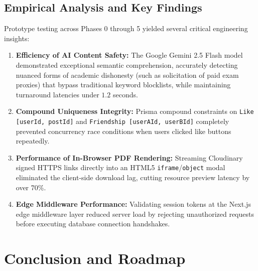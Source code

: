 \documentclass[12pt, a4paper, oneside]{report}
\begin{document}
\section{Empirical Analysis and Key Findings}
Prototype testing across Phases 0 through 5 yielded several critical engineering insights:
\begin{enumerate}[leftmargin=0.7cm]
    \item \textbf{Efficiency of AI Content Safety:} The Google Gemini 2.5 Flash model demonstrated exceptional semantic comprehension, accurately detecting nuanced forms of academic dishonesty (such as solicitation of paid exam proxies) that bypass traditional keyword blocklists, while maintaining turnaround latencies under $1.2$ seconds.
    \item \textbf{Compound Uniqueness Integrity:} Prisma compound constraints on \texttt{Like [userId, postId]} and \texttt{Friendship [userAId, userBId]} completely prevented concurrency race conditions when users clicked like buttons repeatedly.
    \item \textbf{Performance of In-Browser PDF Rendering:} Streaming Cloudinary signed HTTPS links directly into an HTML5 \texttt{iframe}/\texttt{object} modal eliminated the client-side download lag, cutting resource preview latency by over 70\%.
    \item \textbf{Edge Middleware Performance:} Validating session tokens at the Next.js edge middleware layer reduced server load by rejecting unauthorized requests before executing database connection handshakes.
\end{enumerate}

\chapter{Conclusion and Roadmap}
\end{document}
